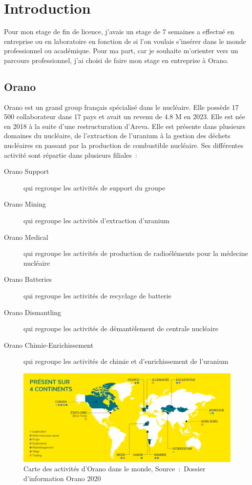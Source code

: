 \section{Introduction}

Pour mon stage de fin de licence, j'avais un stage de 7 semaines a effectué en entreprise ou en laboratoire en fonction de si l'on voulais s'insérer dans le monde professionnel ou académique. Pour ma part, car je souhaite  m'orienter vers un parcours professionnel, j'ai choisi de faire mon stage en entreprise à Orano.
\subsection{Orano}
Orano est un grand group français spécialisé dans le nucléaire. Elle possède 17 500 collaborateur dans 17 pays et avait un revenu de 4.8 M en 2023\cite{report:rapport_activiter}. Elle est née en 2018 à la suite d'une restructuration d'Areva. Elle est présente dans plusieurs domaines du nucléaire, de l'extraction de l'uranium à la gestion des déchets nucléaires en passant par la production de combustible nucléaire. Ses différentes activité sont répartie dans plusieurs filiales~:
\begin{description}
\item [Orano Support] qui regroupe les activités de support du groupe
\item [Orano Mining] qui regroupe les activités d'extraction d'uranium
\item [Orano Medical] qui regroupe les activités de production de radioéléments pour la médecine nucléaire
\item [Orano Batteries] qui regroupe les activités de recyclage de batterie
\item [Orano Dismantling] qui regroupe les activités de démantèlement de centrale nucléaire
\item [Orano Chimie-Enrichissement] qui regroupe les activités de chimie et d'enrichissement de l'uranium
\end{description}
\begin{figure}
    \centering
    \includegraphics[width=\textwidth]{img/Carte-ornao-international.png}
    \caption[Carte des activités d’Orano dans le monde]{Carte des activités d’Orano dans le monde, Source~:~Dossier d’information Orano 2020}
    \label{fig_carte_orano}
\end{figure}









